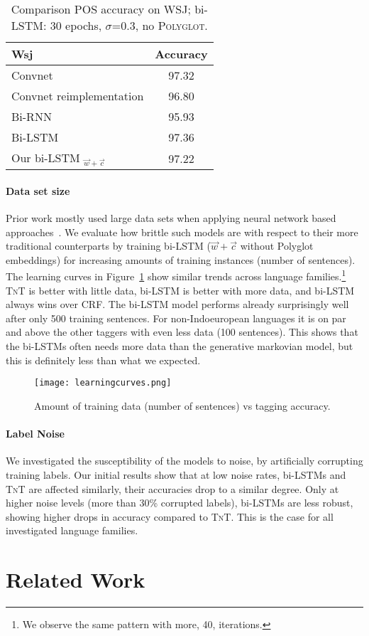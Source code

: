\documentclass[11pt]{article}
\begin{document}
\begin{table}\centering
\begin{small}
\begin{tabular}{lc}
\toprule
{\sc Wsj} & Accuracy\\
\midrule
Convnet \cite{santos:zadrozny:2014} & 97.32\\
Convnet reimplementation \cite{ling:ea:2015} & 96.80\\
Bi-RNN \cite{ling:ea:2015} & 95.93\\
Bi-LSTM \cite{ling:ea:2015} & 97.36\\
\midrule
Our bi-LSTM $_{\vec{w}+\vec{c}}$ & 97.22\\
\bottomrule
\end{tabular}
\end{small}
\caption{Comparison POS accuracy on WSJ; bi-LSTM: 30 epochs, $\sigma$=$0.3$, no \textsc{Polyglot}.}
\label{tbl:WSJ}
\end{table}


\paragraph{Data set size} Prior work mostly used large data sets when applying neural network based 
approaches~\cite{zhang:ea:2015:char}. We evaluate how brittle such models are with respect to their more
traditional counterparts by training bi-LSTM ($\vec{w}+\vec{c}$ without Polyglot embeddings) for increasing amounts of training instances (number of sentences). The learning curves in Figure~\ref{fig:curve} 
show similar trends across language families.\footnote{We observe the same pattern with more, 40, iterations.} 
\textsc{TnT} is better with little data, bi-LSTM is better with more data, 
and bi-LSTM always wins over CRF. The bi-LSTM model performs already surprisingly well after only 500 training sentences. 
For non-Indoeuropean languages it is on par and above the other taggers with even less data (100 sentences). 
This shows that the bi-LSTMs often needs more data than the generative markovian model, but this is definitely less than what we expected. 


\begin{figure}
\texttt{[image: learningcurves.png]}
\caption{Amount of training data (number of sentences) vs tagging accuracy. }
\label{fig:curve}
\end{figure}

\paragraph{Label Noise} We investigated the susceptibility of the models to noise, by artificially corrupting training labels. 
Our initial results show that at low noise rates, bi-LSTMs and \textsc{TnT} are affected similarly, their accuracies drop to a similar degree. Only at higher noise levels (more than 30\% corrupted labels), bi-LSTMs are less robust, showing higher drops in accuracy compared to \textsc{TnT}. This is the case for all investigated language families. \section{Related Work}
\end{document}
